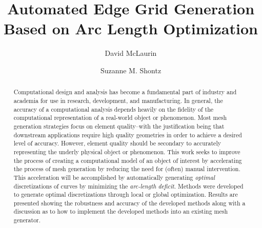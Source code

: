 \documentclass{svmult}
\begin{document}
\title*{Automated Edge Grid Generation Based on Arc Length Optimization}
\author{David McLaurin\and
Suzanne M. Shontz}
%
%
\maketitle

\begin{abstract}
Computational design and analysis has become a fundamental part of industry and academia for use in research, development, and manufacturing.  In general, the accuracy of a computational analysis depends heavily on the fidelity of the computational representation of a real-world object or phenomenon. Most mesh generation strategies focus on element quality--with the justification being that downstream applications require high quality geometries in order to achieve a desired level of accuracy. However, element quality should be secondary to accurately representing the underly physical object or phenomenon. This work seeks to improve the process of creating a computational model of an object of interest by accelerating the process of mesh generation by reducing the need for (often) manual intervention. This acceleration will be accomplished by automatically generating \textit{optimal} discretizations of curves by minimizing the \textit{arc-length deficit}. Methods were developed to generate optimal discretizations through local or global optimization. Results are presented showing the robustness and accuracy of the developed methods along with a discussion as to how to implement the developed methods into an existing mesh generator.
\end{abstract}
\end{document}
